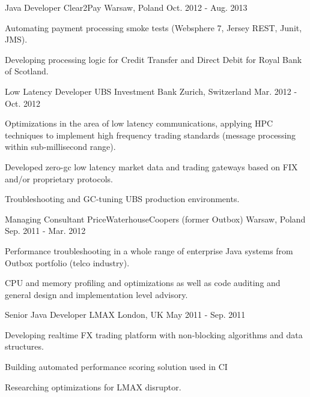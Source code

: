 \begin{cventries}
  \cventry
    {Java Developer} %
    {Clear2Pay} %
    {Warsaw, Poland} %
    {Oct. 2012 - Aug. 2013} %
    {
      \begin{cvitems} %
        \item {Automating payment processing smoke tests (Websphere 7, Jersey REST, Junit, JMS).}
        \item {Developing processing logic for Credit Transfer and Direct Debit for Royal Bank of Scotland.}
      \end{cvitems}
    }

  \cventry
    {Low Latency Developer} %
    {UBS Investment Bank} %
    {Zurich, Switzerland} %
    {Mar. 2012 - Oct. 2012} %
    {
      \begin{cvitems} %
        \item {Optimizations in the area of low latency communications, applying HPC techniques to implement high frequency trading standards (message processing within sub-millisecond range).}
        \item {Developed zero-gc low latency market data and trading gateways based on FIX and/or proprietary protocols.}
        \item {Troubleshooting and GC-tuning UBS production environments.}
      \end{cvitems}
    }

  \cventry
    {Managing Consultant} %
    {PriceWaterhouseCoopers (former Outbox)} %
    {Warsaw, Poland} %
    {Sep. 2011 - Mar. 2012} %
    {
      \begin{cvitems} %
        \item {Performance troubleshooting in a whole range of enterprise Java systems from Outbox portfolio (telco industry).}
        \item {CPU and memory profiling and optimizations as well as code auditing and general design and implementation level advisory.}
      \end{cvitems}
    }

  \cventry
    {Senior Java Developer} %
    {LMAX} %
    {London, UK} %
    {May 2011 - Sep. 2011} %
    {
      \begin{cvitems} %
        \item {Developing realtime FX trading platform with non-blocking algorithms and data structures.}
        \item {Building automated performance scoring solution used in CI}
        \item {Researching optimizations for LMAX disruptor.}
      \end{cvitems}
    }


\end{cventries}
